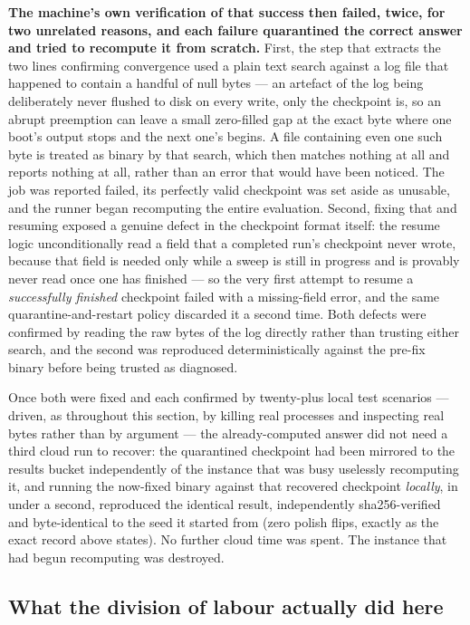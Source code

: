 \documentclass[11pt,a4paper]{article}
\theoremstyle{definition}
\theoremstyle{plain}
\begin{document}
\textbf{The machine's own verification of that success then failed, twice, for two unrelated
reasons, and each failure quarantined the correct answer and tried to recompute it from
scratch.} First, the step that extracts the two lines confirming convergence used a plain text
search against a log file that happened to contain a handful of null bytes --- an artefact of
the log being deliberately never flushed to disk on every write, only the checkpoint is, so an
abrupt preemption can leave a small zero-filled gap at the exact byte where one boot's output
stops and the next one's begins. A file containing even one such byte is treated as binary by
that search, which then matches nothing at all and reports nothing at all, rather than an error
that would have been noticed. The job was reported failed, its perfectly valid checkpoint was
set aside as unusable, and the runner began recomputing the entire evaluation. Second, fixing
that and resuming exposed a genuine defect in the checkpoint format itself: the resume logic
unconditionally read a field that a completed run's checkpoint never wrote, because that field
is needed only while a sweep is still in progress and is provably never read once one has
finished --- so the very first attempt to resume a \emph{successfully finished} checkpoint failed
with a missing-field error, and the same quarantine-and-restart policy discarded it a second
time. Both defects were confirmed by reading the raw bytes of the log directly rather than
trusting either search, and the second was reproduced deterministically against the pre-fix
binary before being trusted as diagnosed.

Once both were fixed and each confirmed by twenty-plus local test scenarios --- driven, as
throughout this section, by killing real processes and inspecting real bytes rather than by
argument --- the already-computed answer did not need a third cloud run to recover: the
quarantined checkpoint had been mirrored to the results bucket independently of the instance
that was busy uselessly recomputing it, and running the now-fixed binary against that recovered
checkpoint \emph{locally}, in under a second, reproduced the identical result, independently
sha256-verified and byte-identical to the seed it started from (zero polish flips, exactly as
the exact record above states). No further cloud time was spent. The instance that had begun
recomputing was destroyed.

\subsection{What the division of labour actually did here}
\label{sec:collab}
\end{document}
